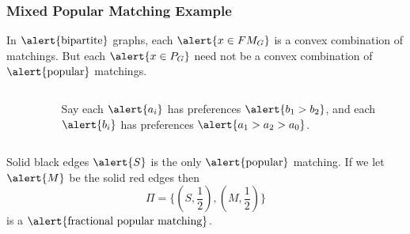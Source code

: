 \documentclass[10pt]{beamer}
\begin{document}
\begin{frame}
\frametitle{Mixed Popular Matching Example}
In $\text{\alert{bipartite}}$ graphs, each $\alert{x \in FM_G}$ is a convex combination of matchings. But each $\alert{x\in P_G}$ need not be a convex combination of $\text{\alert{popular}}$ matchings.
\begin{columns}[T] %
\begin{column}{.48\textwidth}
\begin{figure}
\end{figure}
\end{column}%
\hfill%
\begin{column}{.48\textwidth}
$$ $$
Say each $\alert{a_i}$ has preferences $\alert{b_1 > b_2}$, and each $\alert{b_i}$ has preferences $\alert{a_1 > a_2 > a_0}$.
\end{column}%
\end{columns}
Solid black edges $\alert{S}$ is the only $\text{\alert{popular}}$ matching. If we let $\alert{M}$ be the solid red edges then $$\Pi= \{(S,\frac{1}{2}), (M,\frac{1}{2})\}$$ is a $\text{\alert{fractional popular matching}}$.
\end{frame}
\end{document}
